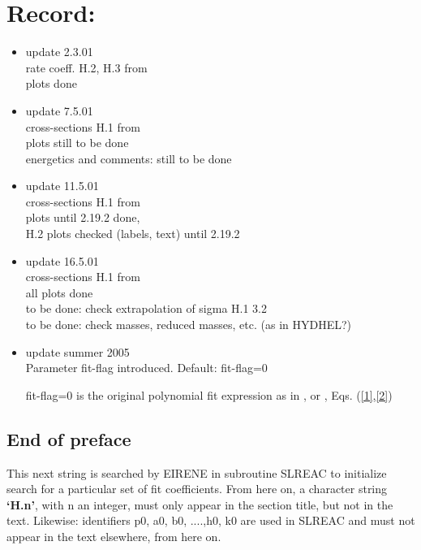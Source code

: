 \documentclass[12pt,dvipdfmx]{article}
\begin{document}
\newpage
\section*{Record:}
\begin{itemize}
\item update  2.3.01 \\
   rate coeff. H.2, H.3 from \cite{kn:Ehrhardt} \\
   plots done
 \item update 7.5.01 \\
   cross-sections H.1 from \cite{kn:Ehrhardt} \\
   plots still to be done \\
   energetics and comments: still to be done
 \item update 11.5.01 \\
   cross-sections H.1 from \cite{kn:Ehrhardt} \\
   plots until 2.19.2 done, \\
   H.2 plots checked (labels, text)  until 2.19.2
 \item update 16.5.01 \\
   cross-sections H.1 from \cite{kn:Ehrhardt} \\
   all plots done \\
   to be done: check extrapolation of sigma H.1  3.2 \\
   to be done: check masses, reduced masses, etc. (as in HYDHEL?)
 \item update summer 2005\\
Parameter fit-flag introduced. Default: fit-flag=0

fit-flag=0 is the original
polynomial fit expression as in \cite{kn:Ehrhardt}, or \cite{kn:Janev}, Eqs. (\ref{1},\ref{2})

\end{itemize}

\newpage


\subsection{End of preface}
This next string is searched by EIRENE in subroutine SLREAC
to initialize search for a particular set of fit coefficients.
From here on, a character string \textbf{`H.n'}, with n an integer, must only appear in the
section title,
but not in the text. Likewise: identifiers p0, a0, b0, ....,h0, k0 are used
in SLREAC and must not
appear in the text elsewhere, from here on.
\end{document}
